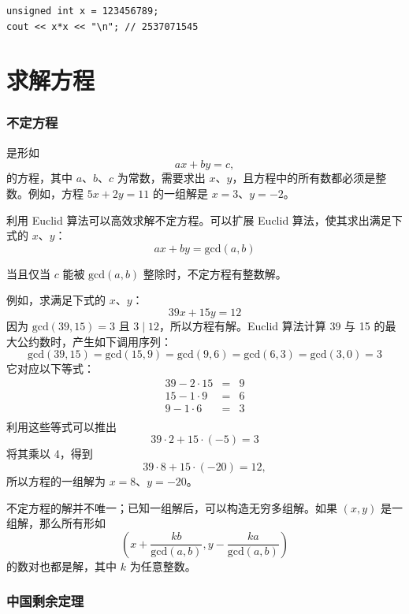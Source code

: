 \begin{lstlisting}
unsigned int x = 123456789;
cout << x*x << "\n"; // 2537071545
\end{lstlisting}

\section{求解方程}

\subsubsection*{不定方程}


是形如
\[ ax + by = c, \]
的方程，其中 $a$、$b$、$c$ 为常数，需要求出 $x$、$y$，且方程中的所有数都必须是整数。例如，方程 $5x+2y=11$ 的一组解是 $x=3$、$y=-2$。


利用 Euclid 算法可以高效求解不定方程。可以扩展 Euclid 算法，使其求出满足下式的 $x$、$y$：
\[
ax + by = \textrm{gcd}(a,b)
\]

当且仅当 $c$ 能被 $\textrm{gcd}(a,b)$ 整除时，不定方程有整数解。

例如，求满足下式的 $x$、$y$：
\[
39x + 15y = 12
\]
因为 $\textrm{gcd}(39,15)=3$ 且 $3 \mid 12$，所以方程有解。Euclid 算法计算 39 与 15 的最大公约数时，产生如下调用序列：
\[
\textrm{gcd}(39,15) = \textrm{gcd}(15,9)
= \textrm{gcd}(9,6) = \textrm{gcd}(6,3)
= \textrm{gcd}(3,0) = 3 \]
它对应以下等式：
\[
\begin{array}{lcl}
39 - 2 \cdot 15 & = & 9 \\
15 - 1 \cdot 9 & = & 6 \\
9 - 1 \cdot 6 & = & 3 \\
\end{array}
\]
利用这些等式可以推出
\[
39 \cdot 2 + 15 \cdot (-5) = 3
\]
将其乘以 4，得到
\[
39 \cdot 8 + 15 \cdot (-20) = 12,
\]
所以方程的一组解为 $x=8$、$y=-20$。

不定方程的解并不唯一；已知一组解后，可以构造无穷多组解。如果 $(x,y)$ 是一组解，那么所有形如
\[(x+\frac{kb}{\textrm{gcd}(a,b)},y-\frac{ka}{\textrm{gcd}(a,b)})\]
的数对也都是解，其中 $k$ 为任意整数。

\subsubsection{中国剩余定理}

